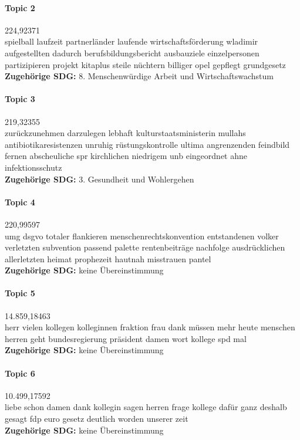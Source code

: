 \documentclass[a4paper,11pt]{article}
\begin{document}
\paragraph{Topic 2} 224,92371 \\
spielball laufzeit partnerländer laufende wirtschaftsförderung wladimir
aufgestellten dadurch berufsbildungsbericht ausbauziele einzelpersonen
partizipieren projekt kitaplus steile nüchtern billiger opel gepflegt
grundgesetz  \\
\textbf{Zugehörige SDG:} 8. Menschenwürdige Arbeit und Wirtschaftswachstum 

\paragraph{Topic 3} 219,32355 \\
zurückzunehmen darzulegen lebhaft kulturstaatsministerin mullahs
antibiotikaresistenzen unruhig rüstungskontrolle ultima angrenzenden feindbild
fernen abscheuliche spr kirchlichen niedrigem unb eingeordnet ahne
infektionsschutz   \\ 
\textbf{Zugehörige SDG:} 3. Gesundheit und Wohlergehen 
    
\paragraph{Topic 4} 220,99597 \\
umg dsgvo totaler flankieren menschenrechtskonvention entstandenen volker
verletzten subvention passend palette rentenbeiträge nachfolge ausdrücklichen
allerletzten heimat prophezeit hautnah misstrauen pantel    \\ 
\textbf{Zugehörige SDG:} keine Übereinstimmung    

\paragraph{Topic 5} 14.859,18463 \\
herr vielen kollegen kolleginnen fraktion frau dank müssen mehr heute menschen
herren geht bundesregierung präsident damen wort kollege spd mal    \\
\textbf{Zugehörige SDG:} keine Übereinstimmung
   
\paragraph{Topic 6} 10.499,17592 \\
liebe schon damen dank kollegin sagen herren frage kollege dafür ganz deshalb
gesagt fdp euro gesetz deutlich worden unserer zeit    \\
\textbf{Zugehörige SDG:} keine Übereinstimmung   
\end{document}
